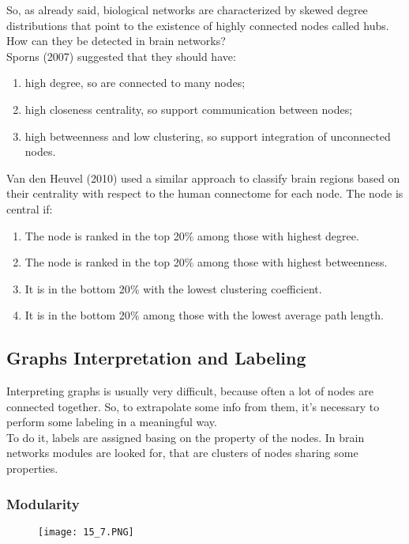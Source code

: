 So, as already said, biological networks are characterized by skewed degree distributions that point to the existence of highly connected nodes called hubs. How can they be detected in brain networks?\\
Sporns (2007) suggested that they should have: 
\begin{enumerate}
    \item high degree, so are connected to many nodes;
    \item high closeness centrality, so support communication between nodes;
    \item high betweenness and low clustering, so support integration of unconnected nodes.
\end{enumerate}
Van den Heuvel (2010) used a similar approach to classify brain regions based on their centrality with respect to the human connectome for each node. The node is central if:
\begin{enumerate}
    \item The node is ranked in the top 20\(\%\) among those with highest degree.
    \item The node is ranked in the top 20\(\%\) among those with highest betweenness.
    \item It is in the bottom 20\(\%\) with the lowest clustering coefficient.
    \item It is in the bottom 20\(\%\) among those with the lowest average path length.
\end{enumerate}
\subsection{Graphs Interpretation and Labeling}
Interpreting graphs is usually very difficult, because often a lot of nodes are connected together. So, to extrapolate some info from them, it's necessary to perform some labeling in a meaningful way.\\
To do it, labels are assigned basing on the property of the nodes. In brain networks modules are looked for, that are clusters of nodes sharing some properties.
\subsubsection{Modularity}

\begin{figure}[H]
    \centering
    \texttt{[image: 15\_7.PNG]}
\end{figure}

